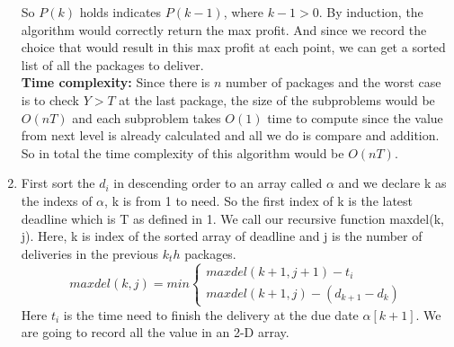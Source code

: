 \documentclass[14pt]{article}
\begin{document}
\begin{enumerate}
\begin{itemize}
  \end{itemize}  
   So $P(k)$ holds indicates $P(k-1)$, where $k-1>0$. By induction, the algorithm
   would correctly return the max profit. And since we record the choice that would
   result in this max profit at each point, we can get a sorted list of all the 
   packages to deliver.\\
   \textbf{Time complexity:} Since there is $n$ number of packages and the worst
   case is to check $Y > T$ at the last package, the size of the subproblems would
   be $O(nT)$ and each subproblem takes $O(1)$ time to compute since the value from
   next level is already calculated and all we do is compare and addition. So in 
   total the time complexity of this algorithm would be $O(nT)$.
      
    \item  First sort the $d_i$ in descending order to an array called $\alpha$ and we declare 
    k as the indexs of $\alpha$, k is from 1 to need. So the first index of k is 
    the latest deadline which is T as defined in 1. We call our recursive function
    maxdel(k, j). Here, k is index of the sorted array of deadline and 
    j is the number of deliveries in the previous $k_th$ packages. \\
    \[
    maxdel(k, j) = min\left\{
                \begin{array}{ll}
                  maxdel(k+1, j+1) - t_i\\
                  maxdel(k+1, j) - (d_{k+1}-d_k)
                \end{array}
              \right.
    \]
    Here $t_i$ is the time need to finish the delivery at the due date 
    $\alpha[k+1]$. We are going to record all the value in an 2-D array.


\end{enumerate}
\end{document}
